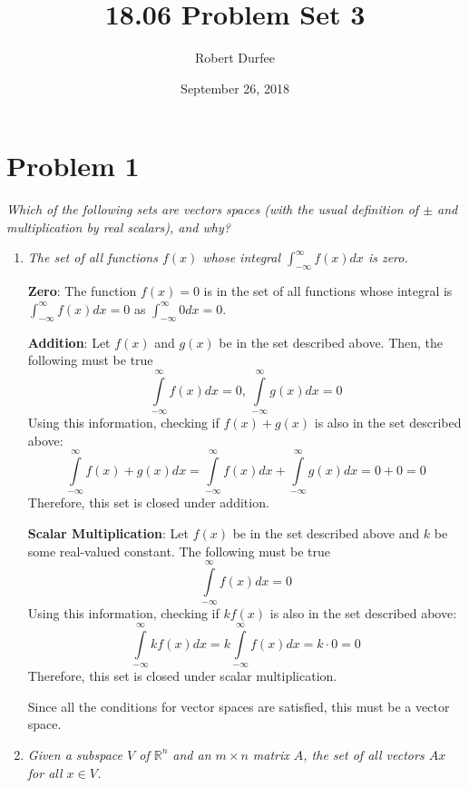 \documentclass{article}
\title{18.06 Problem Set 3}
\author{Robert Durfee}
\date{September 26, 2018}
\begin{document}
\maketitle

\section*{Problem 1}

\textit{Which of the following sets are vectors spaces (with the usual
definition of $\pm$ and multiplication by real scalars), and why? }

\begin{enumerate}
    \item \textit{The set of all functions $f(x)$ whose integral
    $\int_{-\infty}^\infty f(x) dx$ is zero.}

    \bigbreak
    
    {\bf Zero}: The function $ f(x) = 0 $ is in the set of all functions
    whose integral is $ \int_{-\infty}^{\infty} f(x) dx = 0 $ as $
    \int_{-\infty}^{\infty} 0 dx = 0 $.
    
    \bigbreak
    
    {\bf Addition}: Let $ f(x) $ and $ g(x) $ be in the set described above.
    Then, the following must be true
    $$ \int\limits_{-\infty}^{\infty} f(x) dx = 0,\,
    \int\limits_{-\infty}^{\infty} g(x) dx = 0 $$
    Using this information, checking if $ f(x) + g(x) $ is also in the set
    described above:
    $$ \int\limits_{-\infty}^{\infty} f(x) + g(x) dx =
    \int\limits_{-\infty}^{\infty} f(x) dx + \int\limits_{-\infty}^{\infty}
    g(x) dx = 0 + 0 = 0 $$
    Therefore, this set is closed under addition.

    \bigbreak

    {\bf Scalar Multiplication}: Let $ f(x) $ be in the set described above
    and $ k $ be some real-valued constant. The following must be true
    $$ \int\limits_{-\infty}^{\infty} f(x) dx = 0 $$
    Using this information, checking if $ k f(x) $ is also in the set
    described above:
    $$ \int\limits_{-\infty}^{\infty} k f(x) dx = k
    \int\limits_{-\infty}^{\infty} f(x) dx = k \cdot 0 = 0 $$
    Therefore, this set is closed under scalar multiplication.

    \bigbreak

    Since all the conditions for vector spaces are satisfied, this must be a
    vector space.

    \item \textit{Given a subspace $V$ of $ \mathbb{R}^n$ and an $m\times n$
    matrix $A$, the set of all vectors $Ax$ for all $x \in V$.}
    

\end{enumerate}
\end{document}
